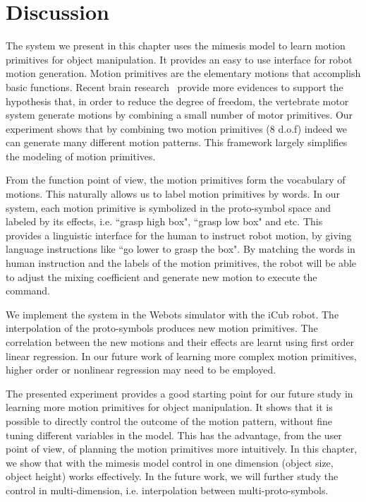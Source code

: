 \section{Discussion}
\label{cha5:sec4}

The system we present in this chapter uses the mimesis model to learn motion primitives for object manipulation. It provides an easy to use interface for robot motion generation. Motion primitives are the elementary motions that accomplish basic functions. Recent brain research~\cite{bizzi2008combining} provide more evidences to support the hypothesis that, in order to reduce the degree of freedom, the vertebrate motor system generate motions by combining a small number of motor primitives. Our experiment shows that by combining two motion primitives (8 d.o.f) indeed we can generate many different motion patterns. This framework largely simplifies the modeling of motion primitives.

From the function point of view, the motion primitives form the vocabulary of motions. This naturally allows us to label motion primitives by words. In our system, each motion primitive is symbolized in the proto-symbol space and labeled by its effects, i.e. ``grasp high box", ``grasp low box" and etc. This provides a linguistic interface for the human to instruct robot motion, by giving language instructions like ``go lower to grasp the box". By matching the words in human instruction and the labels of the motion primitives, the robot will be able to adjust the mixing coefficient and generate new motion to execute the command.

We implement the system in the Webots simulator with the iCub robot. The interpolation of the proto-symbols produces new motion primitives. The correlation between the new motions and their effects are learnt using first order linear regression. In our future work of learning more complex motion primitives, higher order or nonlinear regression may need to be employed.

The presented experiment provides a good starting point for our future study in learning more motion primitives for object manipulation. It shows that it is possible to directly control the outcome of the motion pattern, without fine tuning different variables in the model. This has the advantage, from the user point of view, of planning the motion primitives more intuitively. In this chapter, we show that with the mimesis model control in one dimension (object size, object height) works effectively. In the future work, we will further study the control in multi-dimension, i.e. interpolation between multi-proto-symbols.


